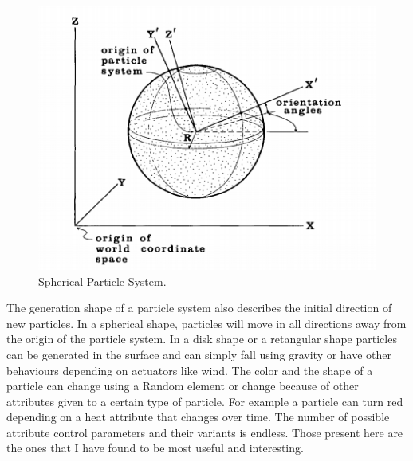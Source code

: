 \begin{figure}
  \includegraphics{particleSystem}
  \caption{Spherical Particle System.}
  \label{fig:one}
\end{figure}

	The generation shape of a particle system also describes the initial direction of new particles. In a spherical shape, particles will move in all directions away from the origin of the particle system. In a disk shape or a retangular shape particles can be generated in the surface and can simply fall using gravity or have other behaviours depending on actuators like wind. The color and the shape of a particle can change using a Random element or change because of other attributes given to a certain type of particle. For example a particle can turn red depending on a heat attribute that changes over time.
	The number of possible attribute control parameters and their variants is endless. Those present here are the ones that I have found to be most useful and interesting.
 
 

